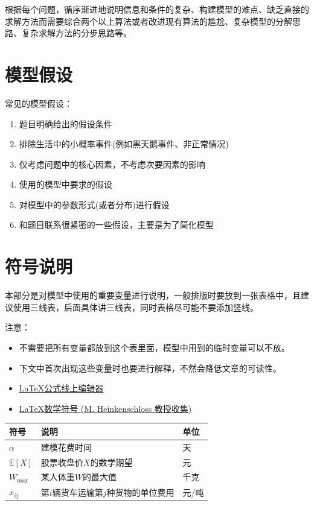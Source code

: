 \documentclass[12pt,utf8]{article}
\begin{document}
根据每个问题，循序渐进地说明信息和条件的复杂、构建模型的难点、缺乏直接的求解方法而需要综合两个以上算法或者改进现有算法的尴尬、复杂模型的分解思路、复杂求解方法的分步思路等。


\section{模型假设}

常见的模型假设：
\begin{enumerate}
\item 题目明确给出的假设条件
\item 排除生活中的小概率事件(例如黑天鹅事件、非正常情况)
\item 仅考虑问题中的核心因素，不考虑次要因素的影响
\item 使用的模型中要求的假设
\item 对模型中的参数形式(或者分布)进行假设
\item 和题目联系很紧密的一些假设，主要是为了简化模型
\end{enumerate}

\section{符号说明}

本部分是对模型中使用的重要变量进行说明，一般排版时要放到一张表格中，且建议使用三线表，后面具体讲三线表，同时表格尽可能不要添加竖线。

注意：
\begin{itemize}
\item 不需要把所有变量都放到这个表里面，模型中用到的临时变量可以不放。
\item 下文中首次出现这些变量时也要进行解释，不然会降低文章的可读性。
\item \href{https://www.latexlive.com/}{\LaTeX 公式线上编辑器}
\item \href{https://www.caam.rice.edu/~heinken/latex/symbols.pdf}{\LaTeX 数学符号 (M. Heinkenschloss 教授收集) }
\end{itemize}

\begin{table}[h]
\centering
\begin{tabular}{p{2cm}<{\centering}p{9cm}<{\centering}p{2cm}<{\centering}}
   \toprule
   符号 & 说明 & 单位 \\
   \midrule
   $\alpha$ & 建模花费时间  & 天   \\
   $\mathbb{E}[X]$ & 股票收盘价$X$的数学期望 & 元 \\
   $W_{\text{max}}$ & 某人体重$W$的最大值 & 千克  \\
   $x_{ij}$ & 第$i$辆货车运输第$j$种货物的单位费用&  元/吨 \\
   \bottomrule
\end{tabular}
\end{table}
\end{document}
